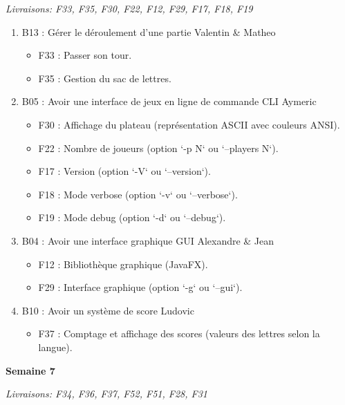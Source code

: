 \documentclass[a4paper,12pt]{article}
\begin{document}
\textit{Livraisons: F33, F35, F30, F22, F12, F29, F17, F18, F19}\newline
\begin{enumerate}
    \item B13 : Gérer le déroulement d’une partie\newline
    Valentin \& Matheo
    \begin{itemize}
        \item F33 : Passer son tour.
        \item F35 : Gestion du sac de lettres.
    \end{itemize}
    \item B05 : Avoir une interface de jeux en ligne de commande CLI\newline
    Aymeric
        \begin{itemize}
            \item F30 : Affichage du plateau (représentation ASCII avec couleurs ANSI).
            \item F22 : Nombre de joueurs (option `-p N` ou `--players N`).
            \item F17 : Version (option `-V` ou `--version`).
            \item F18 : Mode verbose (option `-v` ou `--verbose`).
            \item F19 : Mode debug (option `-d` ou `--debug`).
        \end{itemize}    
    \item B04 : Avoir une interface graphique GUI\newline
    Alexandre \& Jean
        \begin{itemize}
            \item F12 : Bibliothèque graphique (JavaFX).
            \item F29 : Interface graphique (option `-g` ou `--gui`).
        \end{itemize}
    \item B10 : Avoir un système de score\newline
    Ludovic
        \begin{itemize}
            \item F37 : Comptage et affichage des scores (valeurs des lettres selon la langue).\newline
        \end{itemize}
\end{enumerate}

\textbf{\large{Semaine 7}}

\textit{Livraisons: F34, F36, F37, F52, F51, F28, F31}
\end{document}
